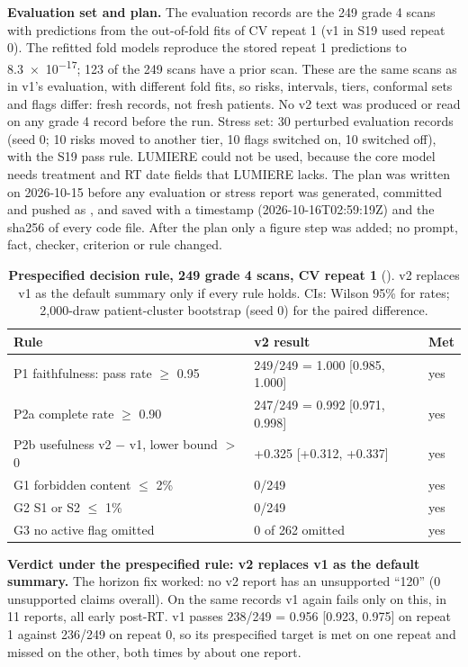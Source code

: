\documentclass[11pt,a4paper]{article}
\begin{document}
\textbf{Evaluation set and plan.} The evaluation records are the 249 grade 4 scans with predictions from the
out-of-fold fits of CV repeat 1 (v1 in S19 used repeat 0). The refitted fold models reproduce the stored repeat 1
predictions to \num{8.3e-17}; 123 of the 249 scans have a prior scan. These are the same scans as in v1's evaluation,
with different fold fits, so risks, intervals, tiers, conformal sets and flags differ: fresh records, not fresh
patients. No v2 text was produced or read on any grade 4 record before the run. Stress set: 30 perturbed evaluation
records (seed 0; 10 risks moved to another tier, 10 flags switched on, 10 switched off), with the S19 pass rule.
LUMIERE could not be used, because the core model needs treatment and RT date fields that LUMIERE lacks. The plan was
written on 2026-10-15 before any evaluation or stress report was generated, committed and pushed as , and
saved with a timestamp (2026-10-16T02:59:19Z) and the sha256 of every code file. After the plan only a figure step was
added; no prompt, fact, checker, criterion or rule changed.

\begin{table}[H]
\centering
\small
\renewcommand{\thetable}{S38}\renewcommand{\theHtable}{S38}
\caption{\textbf{Prespecified decision rule, 249 grade 4 scans, CV repeat 1} (). v2 replaces
v1 as the default summary only if every rule holds. CIs: Wilson 95\% for rates; 2,000-draw patient-cluster bootstrap
(seed 0) for the paired difference.}
\label{tab:S38}
\begin{tabularx}{\linewidth}{@{}L R{5.4cm} R{0.9cm}@{}}
\toprule
Rule & v2 result & Met \\
\midrule
P1 faithfulness: pass rate $\geq$ 0.95 & 249/249 = 1.000 [0.985, 1.000] & yes \\
P2a complete rate $\geq$ 0.90 & 247/249 = 0.992 [0.971, 0.998] & yes \\
P2b usefulness v2 $-$ v1, lower bound $>$ 0 & +0.325 [+0.312, +0.337] & yes \\
G1 forbidden content $\leq$ 2\% & 0/249 & yes \\
G2 S1 or S2 $\leq$ 1\% & 0/249 & yes \\
G3 no active flag omitted & 0 of 262 omitted & yes \\
\bottomrule
\end{tabularx}
\end{table}

\textbf{Verdict under the prespecified rule: v2 replaces v1 as the default summary.} The horizon fix worked: no v2
report has an unsupported ``120'' (0 unsupported claims overall). On the same records v1 again fails only on this, in
11 reports, all early post-RT. v1 passes 238/249 = 0.956 [0.923, 0.975] on repeat 1 against 236/249 on repeat 0, so
its prespecified target is met on one repeat and missed on the other, both times by about one report.
\end{document}

